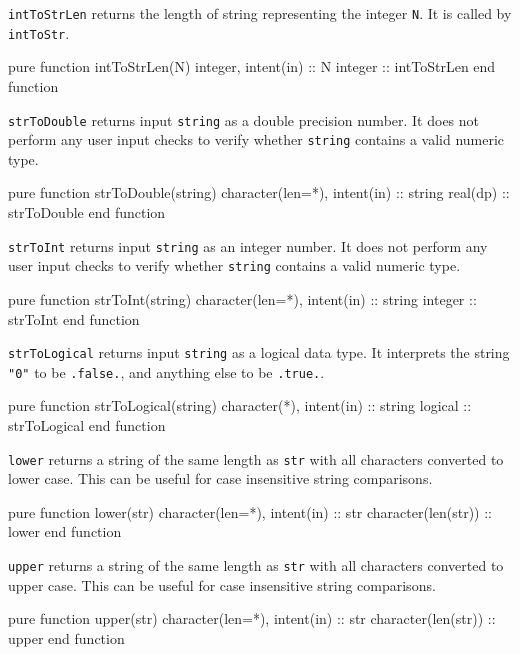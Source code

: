 \documentclass[11pt,thmsa,letter,ukenglish]{article}
\begin{document}
\noindent\texttt{intToStrLen} returns the length of string representing the integer \texttt{N}. It is called by \texttt{intToStr}.
\begin{fortrancode}
pure function intToStrLen(N)
    integer, intent(in) :: N
    integer             :: intToStrLen
end function
\end{fortrancode}

\noindent\texttt{strToDouble} returns input \texttt{string} as a double precision number. It does not perform any user input checks to verify whether \texttt{string} contains a valid numeric type.
\begin{fortrancode}
pure function strToDouble(string)
    character(len=*), intent(in) :: string
    real(dp)                     :: strToDouble
end function
\end{fortrancode}

\noindent\texttt{strToInt} returns input \texttt{string} as an integer number. It does not perform any user input checks to verify whether \texttt{string} contains a valid numeric type.
\begin{fortrancode}
pure function strToInt(string)
    character(len=*), intent(in) :: string
    integer                      :: strToInt
end function
\end{fortrancode}

\noindent\texttt{strToLogical} returns input \texttt{string} as a logical data type. It interprets the string \texttt{"0"} to be \texttt{.false.}, and anything else to be \texttt{.true.}.
\begin{fortrancode}
pure function strToLogical(string)
    character(*), intent(in) :: string
    logical                  :: strToLogical
end function
\end{fortrancode}

\noindent\texttt{lower} returns a string of the same length as \texttt{str} with all characters converted to lower case. This can be useful for case insensitive string comparisons.
\begin{fortrancode}
pure function lower(str)
    character(len=*), intent(in) :: str
    character(len(str))          :: lower
end function
\end{fortrancode}

\noindent\texttt{upper} returns a string of the same length as \texttt{str} with all characters converted to upper case. This can be useful for case insensitive string comparisons.
\begin{fortrancode}
pure function upper(str)
    character(len=*), intent(in) :: str
    character(len(str))          :: upper
end function
\end{fortrancode}
\end{document}
